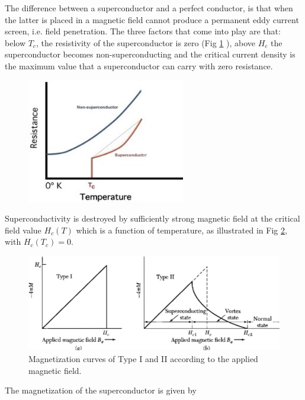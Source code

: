 \documentclass[openany,11pt,a4paper]{report}
\begin{document}
The difference between a superconductor and a perfect
conductor, is that when the latter is placed in a magnetic field cannot produce a permanent eddy current screen, i.e. field penetration. The three factors that come into play are that: below $T_{c}$, the resistivity of the superconductor is zero (Fig \ref{resist} ), above $H_{c}$ the superconductor becomes non-superconducting and the critical current density is the maximum value that a superconductor can carry with zero resistance.\\ 
 
\begin{figure}[H]
\centering
\includegraphics[scale=.9]{Inkedresistancetypes.jpg}
\caption{ \cite{slides}}
\label{resist}
\end{figure}

 
Superconductivity is destroyed by sufficiently strong magnetic field at the critical field value $H_{c}(T)$ which is a function of temperature, as illustrated in Fig \ref{Fig:1}, with $H_{c}(T_{c})=0$.\\

\begin{figure}[H]
\centering
\includegraphics[scale=0.90]{type12.PNG}  
\caption{ Magnetization curves of Type I and II according to the applied magnetic field. \cite{kittel}}
\label{Fig:1}
\end{figure} 
 
 

The magnetization of the superconductor is given by 
\end{document}
